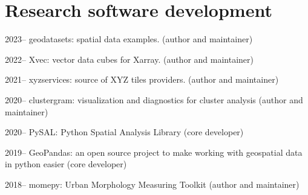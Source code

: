 \documentclass[11pt,a4paper]{report}
\begin{document}


    \section*{Research software development}

    \begin{tablist}

        \item[2023--] \tab{}geodatasets: spatial data examples. (author and maintainer)
        \item[2022--] \tab{}Xvec: vector data cubes for Xarray. (author and maintainer)
        \item[2021--] \tab{}xyzservices: source of XYZ tiles providers. (author and maintainer)
        \item[2020--] \tab{}clustergram: visualization and diagnostics for cluster analysis (author and maintainer)
        \item[2020--] \tab{}PySAL: Python Spatial Analysis Library (core developer)
        \item[2019--] \tab{}GeoPandas: an open source project to make working with geospatial data in python easier (core developer)
        \item[2018--] \tab{}momepy: Urban Morphology Measuring Toolkit (author and maintainer)

    \end{tablist}
\end{document}
